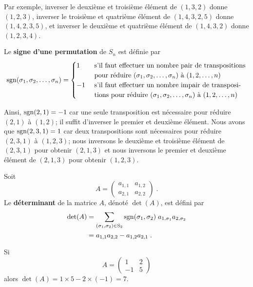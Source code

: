 {Par exemple, inverser le deuxième et troisième élément de $(1,3,2)$
donne $(1,2,3)$, inverser le troisième et quatrième élément de
$(1,4,3,2,5)$ donne $(1,4,2,3,5)$, et inverser le deuxième et
quatrième élément de $(1,4,3,2)$ donne $(1,2,3,4)$.

\begin{defn}
Le {\bfseries signe d'une permutation} de $S_{n}$ est définie par
\[
\operatorname{sgn} (\sigma_1, \sigma_2, \ldots, \sigma_n) =
\begin{cases}
1 & \ \text{s'il faut effectuer un nombre pair de transpositions}\\
& \ \text{pour réduire }(\sigma_1, \sigma_2, \ldots, \sigma_n)\text{ à }
(1,2,\ldots, n) \\
-1 & \ \text{s'il faut effectuer un nombre impair de transposi-}\\
&\ \text{tions pour réduire }(\sigma_1, \sigma_2, \ldots, \sigma_n)\text{ à }
(1,2,\ldots, n)
\end{cases}
\]
\end{defn}

Ainsi, $\operatorname{sgn} (2,1) = -1$ car une seule transposition est nécessaire
pour réduire $(2,1)$ à $(1,2)$; il suffit d'inverser le premier et
deuxième élément.  Nous avons que $\operatorname{sgn} (2,3,1)=1$ car deux transpositions
sont nécessaires pour réduire $(2,3,1)$ à $(1,2,3)$; nous inversons le
deuxième et troisième élément de $(2,3,1)$ pour obtenir $(2,1,3)$ et
nous inversons le premier et deuxième élément de $(2,1,3)$ pour obtenir
$(1,2,3)$.

\begin{defn} 
Soit
\[
A = \begin{pmatrix} a_{1,1} & a_{1,2} \\ a_{2,1} & a_{2,2} \end{pmatrix} \; .
\]
Le {\bfseries déterminant} de la matrice $A$, dénoté $\det(A)$, est
défini par
\begin{align*}
\det(A) &= \sum_{(\sigma_1,\sigma_2) \in \mathrm{S}_{2}} \operatorname{sgn} (\sigma_1,\sigma_2) \;
a_{1,\sigma_1} a_{2,\sigma_2} \\
&= a_{1,1}a_{2,2} - a_{1,2}a_{2,1} \; .
\end{align*}
\end{defn}

\begin{egg}
Si
\[
A= \begin{pmatrix} 1 & 2 \\ -1 & 5 \end{pmatrix}
\]
alors $\det(A) = 1\times 5 - 2 \times (-1) = 7$.
\end{egg}

}
